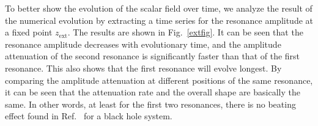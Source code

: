 To better show the evolution of the scalar field over time, we analyze the result of the numerical evolution by extracting a time series for the resonance amplitude at a fixed point $z_{\text{ext}}$.
The results are shown in Fig.~\ref{extfig}. It can be seen that the resonance amplitude decreases with evolutionary time, and the amplitude attenuation of the second resonance is significantly faster than that of the first resonance. This also shows that the first resonance will evolve longest. By comparing the amplitude attenuation at different positions of the same resonance, it can be seen that the attenuation rate and the overall shape are basically the same. In other words, at least for the first two resonances, there is no beating effect found in Ref.~\cite{Witek:2012tr} for a black hole system.
\begin{figure*}
\centering
{}
\caption{Upper panel: Time evolution of the first odd resonance (left) and the first even resonance (right) at $\bar{z}_{\text{ext}}=3$ for $\bar{b}=15$.
Lower panel: Time evolution of the first odd resonance (left) and the first even resonance (right) at $\bar{z}_{\text{ext}}=30$ for $\bar{b}=15$. Here $\bar{z}_{\text{ext}}=kz_{\text{ext}}.$}\label{extfig}
\end{figure*}

